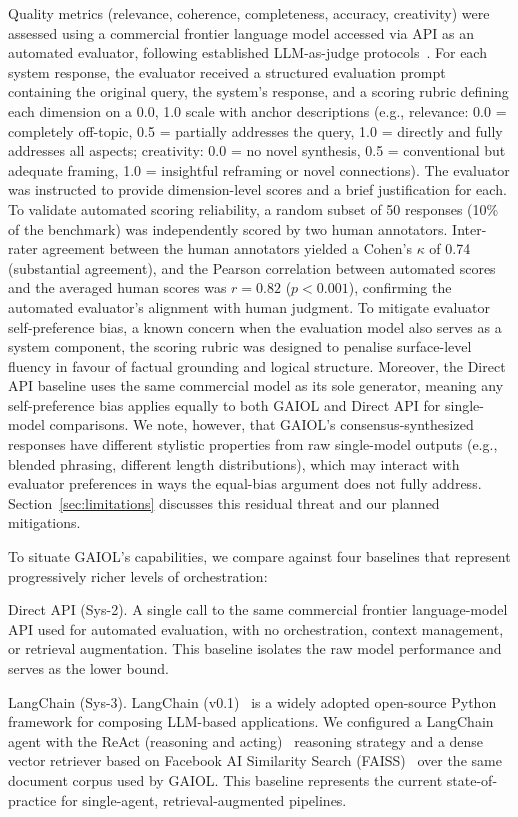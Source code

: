 \documentclass{iopjournal}
\begin{document}
Quality metrics (relevance, coherence, completeness, accuracy, creativity) were assessed using a commercial frontier language model accessed via API as an automated evaluator, following established LLM-as-judge protocols~\cite{HolisticEval}. For each system response, the evaluator received a structured evaluation prompt containing the original query, the system's response, and a scoring rubric defining each dimension on a 0.0, 1.0 scale with anchor descriptions (e.g., relevance: 0.0 = completely off-topic, 0.5 = partially addresses the query, 1.0 = directly and fully addresses all aspects; creativity: 0.0 = no novel synthesis, 0.5 = conventional but adequate framing, 1.0 = insightful reframing or novel connections). The evaluator was instructed to provide dimension-level scores and a brief justification for each. To validate automated scoring reliability, a random subset of 50 responses (10\% of the benchmark) was independently scored by two human annotators. Inter-rater agreement between the human annotators yielded a Cohen's $\kappa$ of 0.74 (substantial agreement), and the Pearson correlation between automated scores and the averaged human scores was $r = 0.82$ ($p < 0.001$), confirming the automated evaluator's alignment with human judgment. To mitigate evaluator self-preference bias, a known concern when the evaluation model also serves as a system component, the scoring rubric was designed to penalise surface-level fluency in favour of factual grounding and logical structure. Moreover, the Direct API baseline uses the same commercial model as its sole generator, meaning any self-preference bias applies equally to both GAIOL and Direct API for single-model comparisons. We note, however, that GAIOL's consensus-synthesized responses have different stylistic properties from raw single-model outputs (e.g., blended phrasing, different length distributions), which may interact with evaluator preferences in ways the equal-bias argument does not fully address. Section~\ref{sec:limitations} discusses this residual threat and our planned mitigations.

To situate GAIOL's capabilities, we compare against four baselines that represent progressively richer levels of orchestration:

Direct API (Sys-2). A single call to the same commercial frontier language-model API used for automated evaluation, with no orchestration, context management, or retrieval augmentation. This baseline isolates the raw model performance and serves as the lower bound.

LangChain (Sys-3). LangChain (v0.1)~\cite{LangChain} is a widely adopted open-source Python framework for composing LLM-based applications. We configured a LangChain agent with the ReAct (reasoning and acting)~\cite{ReAct} reasoning strategy and a dense vector retriever based on Facebook AI Similarity Search (FAISS)~\cite{DPR} over the same document corpus used by GAIOL. This baseline represents the current state-of-practice for single-agent, retrieval-augmented pipelines.
\end{document}
